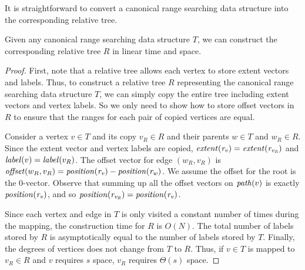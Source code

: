 It is straightforward to convert a canonical range searching data structure into the corresponding relative tree.
\begin{lemma}\label{lem:abs2rel}
Given any canonical range searching data structure $T$, we can construct the corresponding relative tree $R$ in linear time and space. 
\end{lemma}
\begin{proof}
First, note that a relative tree allows each vertex to store extent vectors and labels. Thus, to construct a relative tree $R$ representing the canonical range searching data structure $T$, we can simply copy the entire tree including extent vectors and vertex labels. So we only need to show how to store offset vectors in $R$ to ensure that the ranges for each pair of copied vertices are equal.

Consider a vertex $v \in T$ and its copy $v_R \in R$ and their parents $w \in T$ and $w_R \in R$. Since the extent vector and vertex labels are copied, $\mathit{extent}(\mathit{r_{v}}) = \mathit{extent}(\mathit{r_{v_R}})$ and $\mathit{label}(v) = \mathit{label}(v_R)$. The offset vector for edge $(w_R, v_R)$ is $\mathit{offset}(w_R, v_R) = \mathit{position}(\mathit{r_{v}}) - \mathit{position}(\mathit{r_{w}})$. We assume the offset for the root is the 0-vector. Observe that summing up all the offset vectors on $\mathit{path}(v)$ is exactly $\mathit{position}(\mathit{r_{v}})$, and so $\mathit{position}(\mathit{r_{v_R}}) = \mathit{position}(\mathit{r_{v}})$.

Since each vertex and edge in $T$ is only visited a constant number of times during the mapping, the construction time for $R$ is $O(N)$. The total number of labels stored by $R$ is asymptotically equal to the number of labels stored by $T$. Finally, the degrees of vertices does not change from $T$ to $R$. Thus, if $v \in T$ is mapped to $v_R \in R$ and $v$ requires $s$ space, $v_R$ requires $\Theta(s)$ space.
\end{proof}

